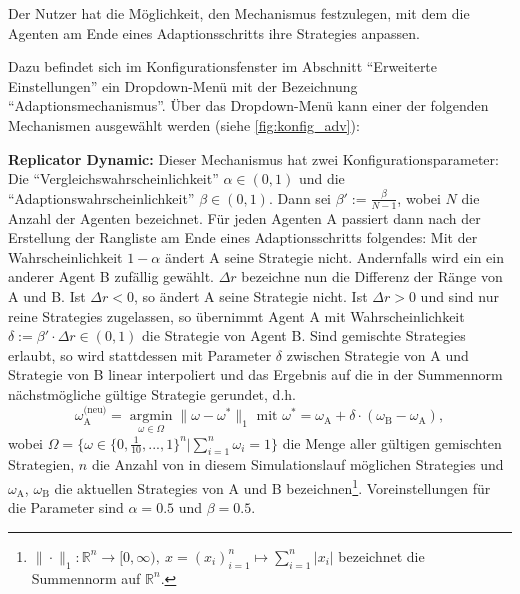 \documentclass[parskip=full,11pt]{scrartcl}
\def\adapt{Adaptionsschritt}
\begin{document}
Der \Gls{Nutzer} hat die Möglichkeit, den Mechanismus festzulegen, mit dem die Agenten am Ende eines \adapt s ihre \Glspl{Strategie} anpassen.

Dazu befindet sich im Konfigurationsfenster im Abschnitt \enquote{Erweiterte Einstellungen} ein Dropdown-Menü mit der Bezeichnung \enquote{Adaptionsmechanismus}. Über das Dropdown-Menü kann einer der folgenden Mechanismen ausgewählt werden (siehe \cref{fig:konfig_adv}):

\textbf{Replicator Dynamic:}
Dieser Mechanismus hat zwei Konfigurationsparameter: Die \enquote{Vergleichswahrscheinlichkeit} \(\alpha \in (0,1)\) und die \enquote{Adaptionswahrscheinlichkeit} \(\beta \in (0,1)\). Dann sei \(\beta' := \frac{\beta}{N-1}\), wobei \(N\) die Anzahl der Agenten bezeichnet. Für jeden Agenten A passiert dann nach der Erstellung der Rangliste am Ende eines \adapt s folgendes: Mit der Wahrscheinlichkeit \(1 - \alpha\) ändert A seine \Gls{Strategie} nicht. Andernfalls wird ein ein anderer Agent B zufällig gewählt. \(\Delta r\) bezeichne nun die Differenz der Ränge von A und B. Ist \(\Delta r < 0\), so ändert A seine \Gls{Strategie} nicht. Ist \(\Delta r > 0\) und sind nur reine \Glspl{Strategie} zugelassen, so übernimmt Agent A mit Wahrscheinlichkeit \(\delta := \beta' \cdot \Delta r \in (0,1)\) die \Gls{Strategie} von Agent B. Sind \glspl{gemischte Strategie} erlaubt, so wird stattdessen mit Parameter \(\delta\) zwischen \Gls{Strategie} von A und \Gls{Strategie} von B linear interpoliert und das Ergebnis auf die in der Summennorm nächstmögliche gültige \Gls{Strategie} gerundet, d.h.
\[
\omega_\text{A}^\text{(neu)} = \underset{\omega \in \Omega}{\operatorname{arg min}} \|\omega - \omega^*\|_1 \text{  mit  } \omega^* = \omega_\text{A} + \delta \cdot (\omega_\text{B} - \omega_\text{A}),
\]
wobei \(\Omega = \{\omega \in \{0,\frac{1}{10},...,1\}^n | \sum_{i=1}^n \omega_i = 1\}\) die Menge aller gültigen gemischten Strategien, \(n\) die Anzahl von in diesem Simulationslauf möglichen \Glspl{Strategie} und \(\omega_\text{A}\), \(\omega_\text{B}\) die aktuellen \Glspl{Strategie} von A und B bezeichnen\footnote{\(\|\cdot\|_1 : \mathbb{R}^n \rightarrow [0,\infty), \ x = (x_i)_{i=1}^n \mapsto \sum_{i=1}^n |x_i|\) bezeichnet die Summennorm auf \(\mathbb{R}^n\).}. Voreinstellungen für die Parameter sind \(\alpha = 0.5\) und \(\beta = 0.5\).
\end{document}
